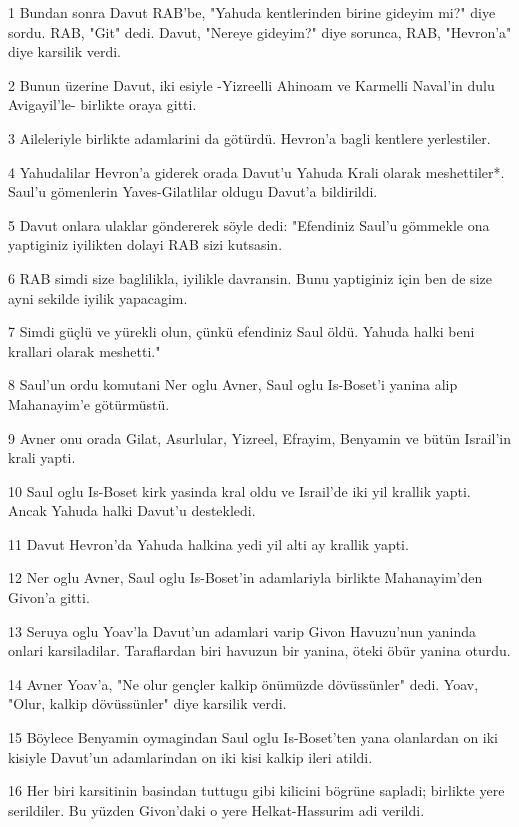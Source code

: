 \par 1 Bundan sonra Davut RAB'be, "Yahuda kentlerinden birine gideyim mi?" diye sordu. RAB, "Git" dedi. Davut, "Nereye gideyim?" diye sorunca, RAB, "Hevron'a" diye karsilik verdi.
\par 2 Bunun üzerine Davut, iki esiyle -Yizreelli Ahinoam ve Karmelli Naval'in dulu Avigayil'le- birlikte oraya gitti.
\par 3 Aileleriyle birlikte adamlarini da götürdü. Hevron'a bagli kentlere yerlestiler.
\par 4 Yahudalilar Hevron'a giderek orada Davut'u Yahuda Krali olarak meshettiler*. Saul'u gömenlerin Yaves-Gilatlilar oldugu Davut'a bildirildi.
\par 5 Davut onlara ulaklar göndererek söyle dedi: "Efendiniz Saul'u gömmekle ona yaptiginiz iyilikten dolayi RAB sizi kutsasin.
\par 6 RAB simdi size baglilikla, iyilikle davransin. Bunu yaptiginiz için ben de size ayni sekilde iyilik yapacagim.
\par 7 Simdi güçlü ve yürekli olun, çünkü efendiniz Saul öldü. Yahuda halki beni krallari olarak meshetti."
\par 8 Saul'un ordu komutani Ner oglu Avner, Saul oglu Is-Boset'i yanina alip Mahanayim'e götürmüstü.
\par 9 Avner onu orada Gilat, Asurlular, Yizreel, Efrayim, Benyamin ve bütün Israil'in krali yapti.
\par 10 Saul oglu Is-Boset kirk yasinda kral oldu ve Israil'de iki yil krallik yapti. Ancak Yahuda halki Davut'u destekledi.
\par 11 Davut Hevron'da Yahuda halkina yedi yil alti ay krallik yapti.
\par 12 Ner oglu Avner, Saul oglu Is-Boset'in adamlariyla birlikte Mahanayim'den Givon'a gitti.
\par 13 Seruya oglu Yoav'la Davut'un adamlari varip Givon Havuzu'nun yaninda onlari karsiladilar. Taraflardan biri havuzun bir yanina, öteki öbür yanina oturdu.
\par 14 Avner Yoav'a, "Ne olur gençler kalkip önümüzde dövüssünler" dedi. Yoav, "Olur, kalkip dövüssünler" diye karsilik verdi.
\par 15 Böylece Benyamin oymagindan Saul oglu Is-Boset'ten yana olanlardan on iki kisiyle Davut'un adamlarindan on iki kisi kalkip ileri atildi.
\par 16 Her biri karsitinin basindan tuttugu gibi kilicini bögrüne sapladi; birlikte yere serildiler. Bu yüzden Givon'daki o yere Helkat-Hassurim adi verildi.
